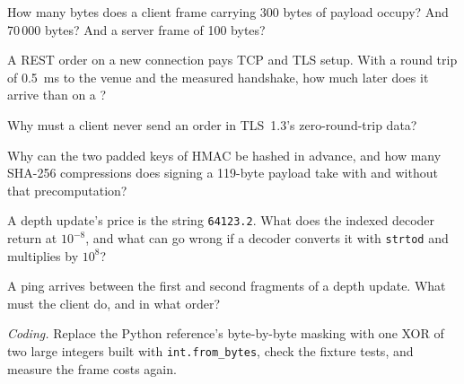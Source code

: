 \begin{exercise}[$\star$]\label{exo:ll:websocket-rest-tls-and-json-at-speed:1}
How many bytes does a client frame carrying 300 bytes of payload occupy? And 70\,000 bytes? And a server frame of 100 bytes?
\end{exercise}

\begin{exercise}[$\star$]\label{exo:ll:websocket-rest-tls-and-json-at-speed:2}
A REST order on a new connection pays TCP and TLS setup. With a round trip of \qty{0.5}{\milli\second} to the venue and the
measured handshake, how much later does it arrive than on a ?
\end{exercise}

\begin{exercise}[$\star$]\label{exo:ll:websocket-rest-tls-and-json-at-speed:3}
Why must a client never send an order in TLS~1.3's zero-round-trip data?
\end{exercise}

\begin{exercise}[$\star\star$]\label{exo:ll:websocket-rest-tls-and-json-at-speed:4}
Why can the two padded keys of HMAC be hashed in advance, and how many SHA-256 compressions does signing a 119-byte payload
take with and without that precomputation?
\end{exercise}

\begin{exercise}[$\star\star$]\label{exo:ll:websocket-rest-tls-and-json-at-speed:5}
A depth update's price is the string \texttt{64123.2}. What does the indexed decoder return at $10^{-8}$, and what can go wrong if a
decoder converts it with \texttt{strtod} and multiplies by $10^8$?
\end{exercise}

\begin{exercise}[$\star\star$]\label{exo:ll:websocket-rest-tls-and-json-at-speed:6}
A ping arrives between the first and second fragments of a depth update. What must the client do, and in what order?
\end{exercise}

\begin{exercise}[$\star\star\star$]\label{exo:ll:websocket-rest-tls-and-json-at-speed:7}
\emph{Coding.} Replace the Python reference's byte-by-byte masking with one XOR of two large integers built with
\texttt{int.from\_bytes}, check the fixture tests, and measure the frame costs again.
\end{exercise}

